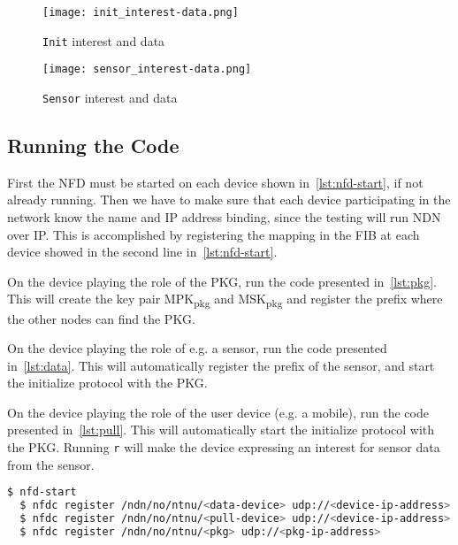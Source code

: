 \begin{figure}[ht]
  \centering
  \texttt{[image: init\_interest-data.png]}
  \caption[Init Interest and Data packet]{\texttt{Init} \gls{interest} and \gls{data}}
  \label{fig:init_interest-data}
\end{figure}

\begin{figure}[ht]
  \centering
  \texttt{[image: sensor\_interest-data.png]}
  \caption[Sensor Interest and Data packet]{\texttt{Sensor} \gls{interest} and \gls{data}}
  \label{fig:sensor_interest-data}
\end{figure}

\subsection{Running the Code}
First the \gls{NFD} must be started on each device shown in~\autoref{lst:nfd-start}, if not already running. 
Then we have to make sure that each device participating in the network know the \gls{name} and \gls{IP} address binding, since the testing will run \gls{NDN} over \gls{IP}.
This is accomplished by registering the mapping in the \gls{FIB} at each device showed in the second line in~\autoref{lst:nfd-start}.

On the device playing the role of the \gls{PKG}, run the code presented in~\autoref{lst:pkg}. 
This will create the key pair MPK\textsubscript{pkg} and MSK\textsubscript{pkg} and register the prefix where the other nodes can find the \gls{PKG}.

On the device playing the role of e.g. a sensor, run the code presented in~\autoref{lst:data}.
This will automatically register the prefix of the sensor, and start the initialize protocol with the \gls{PKG}.

On the device playing the role of the user device (e.g. a mobile), run the code presented in~\autoref{lst:pull}.
This will automatically start the initialize protocol with the \gls{PKG}.
Running \texttt{r} will make the device expressing an \gls{interest} for sensor \gls{data} from the sensor.

\begin{lstlisting}[language=bash, caption={Start NFD}, label={lst:nfd-start}]
  $ nfd-start
  $ nfdc register /ndn/no/ntnu/<data-device> udp://<device-ip-address>
  $ nfdc register /ndn/no/ntnu/<pull-device> udp://<device-ip-address>
  $ nfdc register /ndn/no/ntnu/<pkg> udp://<pkg-ip-address>
\end{lstlisting}

